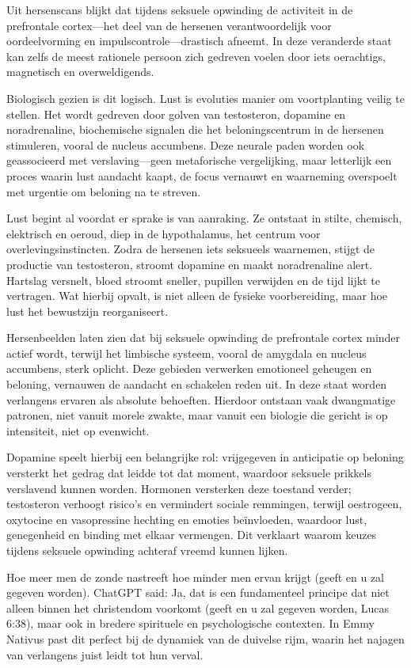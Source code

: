 Uit hersenscans blijkt dat tijdens seksuele opwinding de activiteit in de prefrontale cortex—het deel van de hersenen verantwoordelijk voor oordeelvorming en impulscontrole—drastisch afneemt. In deze veranderde staat kan zelfs de meest rationele persoon zich gedreven voelen door iets oerachtigs, magnetisch en overweldigends.

Biologisch gezien is dit logisch. Lust is evoluties manier om voortplanting veilig te stellen. Het wordt gedreven door golven van testosteron, dopamine en noradrenaline, biochemische signalen die het beloningscentrum in de hersenen stimuleren, vooral de nucleus accumbens. Deze neurale paden worden ook geassocieerd met verslaving—geen metaforische vergelijking, maar letterlijk een proces waarin lust aandacht kaapt, de focus vernauwt en waarneming overspoelt met urgentie om beloning na te streven.

Lust begint al voordat er sprake is van aanraking. Ze ontstaat in stilte, chemisch, elektrisch en oeroud, diep in de hypothalamus, het centrum voor overlevingsinstincten. Zodra de hersenen iets seksueels waarnemen, stijgt de productie van testosteron, stroomt dopamine en maakt noradrenaline alert. Hartslag versnelt, bloed stroomt sneller, pupillen verwijden en de tijd lijkt te vertragen. Wat hierbij opvalt, is niet alleen de fysieke voorbereiding, maar hoe lust het bewustzijn reorganiseert.

Hersenbeelden laten zien dat bij seksuele opwinding de prefrontale cortex minder actief wordt, terwijl het limbische systeem, vooral de amygdala en nucleus accumbens, sterk oplicht. Deze gebieden verwerken emotioneel geheugen en beloning, vernauwen de aandacht en schakelen reden uit. In deze staat worden verlangens ervaren als absolute behoeften. Hierdoor ontstaan vaak dwangmatige patronen, niet vanuit morele zwakte, maar vanuit een biologie die gericht is op intensiteit, niet op evenwicht.

Dopamine speelt hierbij een belangrijke rol: vrijgegeven in anticipatie op beloning versterkt het gedrag dat leidde tot dat moment, waardoor seksuele prikkels verslavend kunnen worden. Hormonen versterken deze toestand verder; testosteron verhoogt risico's en vermindert sociale remmingen, terwijl oestrogeen, oxytocine en vasopressine hechting en emoties beïnvloeden, waardoor lust, genegenheid en binding met elkaar vermengen. Dit verklaart waarom keuzes tijdens seksuele opwinding achteraf vreemd kunnen lijken.

Hoe meer men de zonde nastreeft hoe minder men ervan krijgt (geeft en u zal gegeven worden).
ChatGPT said:
Ja, dat is een fundamenteel principe dat niet alleen binnen het christendom voorkomt (geeft en u zal gegeven worden, Lucas 6:38), maar ook in bredere spirituele en psychologische contexten. In Emmy Nativus past dit perfect bij de dynamiek van de duivelse rijm, waarin het najagen van verlangens juist leidt tot hun verval.

